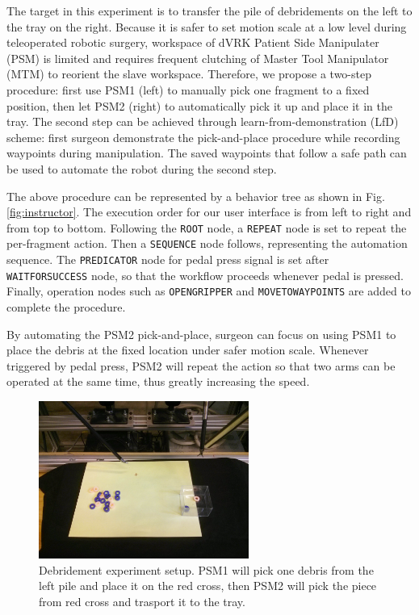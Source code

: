 \documentclass[letterpaper, 10 pt, conference]{ieeeconf}
\begin{document}
The target in this experiment is to transfer the pile of debridements  on the left to the tray on the right. Because it is safer to set motion scale at a low level during teleoperated robotic surgery, workspace of dVRK Patient Side Manipulater (PSM) is limited and requires frequent clutching of Master Tool Manipulator (MTM) to reorient the slave workspace. Therefore, we propose a two-step procedure: first use PSM1 (left) to manually pick one fragment to a fixed position, then let PSM2 (right) to automatically pick it up and place it in the tray. The second step can be achieved through learn-from-demonstration (LfD) scheme: first surgeon demonstrate the pick-and-place procedure while recording waypoints during manipulation. The saved waypoints that follow a safe path can be used to automate the robot during the second step. 

The above procedure can be represented by a behavior tree as shown in Fig. \ref{fig:instructor}. The execution order for our user interface is from left to right and from top to bottom. Following the \texttt{ROOT} node, a \texttt{REPEAT} node is set to repeat the per-fragment action. Then a \texttt{SEQUENCE} node follows, representing the automation sequence. The \texttt{PREDICATOR} node for pedal press signal is set after \texttt{WAITFORSUCCESS} node, so that the workflow proceeds whenever pedal is pressed. Finally, operation nodes such as \texttt{OPENGRIPPER} and \texttt{MOVETOWAYPOINTS} are added to complete the procedure. 

By automating the PSM2 pick-and-place, surgeon can focus on using PSM1 to place the debris at the fixed location under safer motion scale. Whenever triggered by pedal press, PSM2 will repeat the action so that two arms can be operated at the same time, thus greatly increasing the speed.  


\begin{figure}[bt]
\centering
\includegraphics[width=195pt]{debridement.jpg}
\caption{Debridement experiment setup. PSM1 will pick one debris from the left pile and place it on the red cross, then PSM2 will pick the piece from red cross and trasport it to the tray.}
\label{fig:debridement}
\end{figure}
\end{document}
